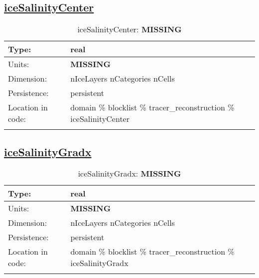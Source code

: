 \subsection[iceSalinityCenter]{\hyperref[sec:var_tab_tracer_reconstruction]{iceSalinityCenter}}
\label{subsec:var_sec_tracer_reconstruction_iceSalinityCenter}
\begin{center}
\begin{longtable}{| p{2.0in} | p{4.0in} |}
        \hline 
        Type: & real \\
        \hline 
        Units: & {\bf \color{red} MISSING} \\
        \hline 
        Dimension: & nIceLayers nCategories nCells \\
        \hline 
        Persistence: & persistent \\
        \hline 
         Location in code: & domain \% blocklist \% tracer\_reconstruction \% iceSalinityCenter \\
         \hline 
    \caption{iceSalinityCenter: {\bf \color{red} MISSING}}
\end{longtable}
\end{center}
\subsection[iceSalinityGradx]{\hyperref[sec:var_tab_tracer_reconstruction]{iceSalinityGradx}}
\label{subsec:var_sec_tracer_reconstruction_iceSalinityGradx}
\begin{center}
\begin{longtable}{| p{2.0in} | p{4.0in} |}
        \hline 
        Type: & real \\
        \hline 
        Units: & {\bf \color{red} MISSING} \\
        \hline 
        Dimension: & nIceLayers nCategories nCells \\
        \hline 
        Persistence: & persistent \\
        \hline 
         Location in code: & domain \% blocklist \% tracer\_reconstruction \% iceSalinityGradx \\
         \hline 
    \caption{iceSalinityGradx: {\bf \color{red} MISSING}}
\end{longtable}
\end{center}
